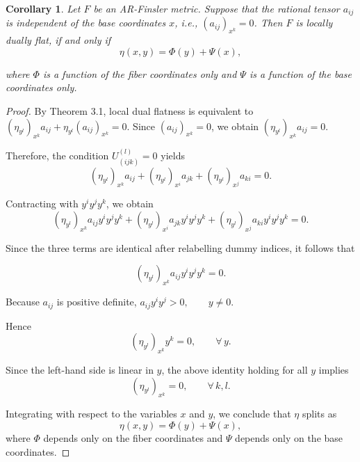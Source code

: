 \documentclass[12pt]{article}
\newtheorem{corollary}[theorem]{Corollary}
\theoremstyle{definition}
\begin{document}
						
						\begin{corollary}
							Let $F$ be an AR-Finsler metric. Suppose that the rational tensor $a_{ij}$ is independent of the base coordinates $x$, i.e., $(a_{ij})_{x^{k}}=0$. Then \(F\) is locally dually flat, if and only if
							\begin{equation}
							\eta(x,y)=\Phi(y)+\Psi(x),   
							\end{equation}
							
							where \(\Phi\) is a function of the fiber coordinates only and \(\Psi\) is a function of the base coordinates only.
						\end{corollary}
						
						\begin{proof}
							By Theorem 3.1, local dual flatness is equivalent to $(\eta_{y^{l}})_{x^{k}}a_{ij}+\eta_{y^{l}}(a_{ij})_{x^{k}}=0$. Since \((a_{ij})_{x^{k}}=0\), we obtain $(\eta_{y^{l}})_{x^{k}}a_{ij}=0$.
							
							Therefore, the condition \(U^{(l)}_{(ijk)}=0\) yields
							\[
							(\eta_{y^{l}})_{x^{k}}a_{ij}
							+
							(\eta_{y^{l}})_{x^{i}}a_{jk}
							+
							(\eta_{y^{l}})_{x^{j}}a_{ki}
							=0.
							\]
							
							Contracting with \(y^{i}y^{j}y^{k}\), we obtain
							\[
							(\eta_{y^{l}})_{x^{k}}a_{ij}y^{i}y^{j}y^{k}
							+
							(\eta_{y^{l}})_{x^{i}}a_{jk}y^{i}y^{j}y^{k}
							+
							(\eta_{y^{l}})_{x^{j}}a_{ki}y^{i}y^{j}y^{k}
							=0.
							\]
							
							Since the three terms are identical after relabelling dummy indices, it follows that
							
							\[
							(\eta_{y^{l}})_{x^{k}}a_{ij}y^{i}y^{j}y^{k}=0.
							\]
							
							Because \(a_{ij}\) is positive definite, $a_{ij}y^{i}y^{j}>0,
							\qquad y\neq 0.$
							
							Hence
							\[
							(\eta_{y^{l}})_{x^{k}}y^{k}=0,
							\qquad \forall\, y.
							\]
							
							Since the left-hand side is linear in \(y\), the above identity holding for all \(y\) implies
							\[
							(\eta_{y^{l}})_{x^{k}}=0,
							\qquad \forall\, k,l.
							\]
							
							Integrating with respect to the variables \(x\) and \(y\), we conclude that \(\eta\) splits as
							\[
							\eta(x,y)=\Phi(y)+\Psi(x),
							\]
							where \(\Phi\) depends only on the fiber coordinates and \(\Psi\) depends only on the base coordinates.
						\end{proof}
						
\end{document}
